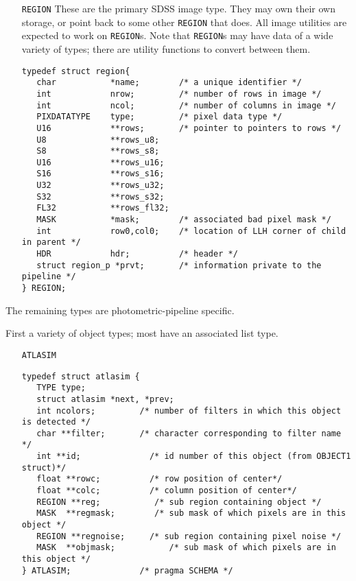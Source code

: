 {\begin{itemize}
\item[{\tt REGION}]
These are the primary SDSS image type. They may own their
own storage, or point back to some other {\tt REGION} that does. All
image utilities are expected to work on {\tt REGION}s. Note that
{\tt REGION}s may have data of a wide variety of types;
there are utility functions to convert between them.

\begin{verbatim}
typedef struct region{
   char           *name;        /* a unique identifier */
   int            nrow;         /* number of rows in image */
   int            ncol;         /* number of columns in image */
   PIXDATATYPE    type;         /* pixel data type */
   U16            **rows;       /* pointer to pointers to rows */
   U8             **rows_u8;
   S8             **rows_s8;
   U16            **rows_u16;
   S16            **rows_s16;
   U32            **rows_u32;
   S32            **rows_s32;
   FL32           **rows_fl32;
   MASK           *mask;        /* associated bad pixel mask */
   int            row0,col0;    /* location of LLH corner of child in parent */
   HDR            hdr;          /* header */
   struct region_p *prvt;       /* information private to the pipeline */
} REGION;
\end{verbatim}

\end{itemize}


The remaining types are photometric-pipeline specific.

First a variety of object types; most have an associated list type.

\begin{itemize}

\item[{\tt ATLASIM}]

\begin{verbatim}
typedef struct atlasim {
   TYPE type;
   struct atlasim *next, *prev;
   int ncolors;         /* number of filters in which this object is detected */
   char **filter;       /* character corresponding to filter name */
   int **id;              /* id number of this object (from OBJECT1 struct)*/
   float **rowc;          /* row position of center*/
   float **colc;          /* column position of center*/
   REGION **reg;           /* sub region containing object */
   MASK  **regmask;        /* sub mask of which pixels are in this object */
   REGION **regnoise;     /* sub region containing pixel noise */
   MASK  **objmask;           /* sub mask of which pixels are in this object */
} ATLASIM;              /* pragma SCHEMA */
\end{verbatim}


\end{itemize}}
